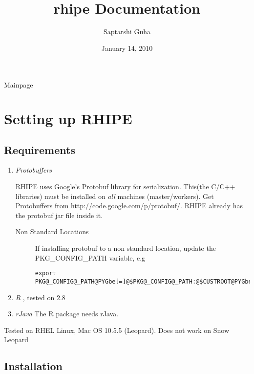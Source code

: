 \documentclass[letterpaper,10pt,english]{manual}
\title{rhipe Documentation}
\date{January 14, 2010}
\author{Saptarshi Guha}
\begin{document}
\maketitle
\tableofcontents



Mainpage

\resetcurrentobjects
\hypertarget{--doc-installation}{}

\chapter{Setting up RHIPE}


\section{Requirements}
\begin{enumerate}
\item {} 
\emph{Protobuffers}

RHIPE uses Google's Protobuf library for serialization. This(the C/C++
libraries) must be installed on \emph{all} machines (master/workers). Get
Protobuffers from \href{http://code.google.com/p/protobuf/}{http://code.google.com/p/protobuf/}. RHIPE already has the
protobuf jar file inside it.
\begin{description}
\item[Non Standard Locations]
If installing protobuf to a non standard location, update the
PKG\_CONFIG\_PATH variable, e.g

\begin{Verbatim}[commandchars=@\[\]]
export PKG@_CONFIG@_PATH@PYGbe[=]@$PKG@_CONFIG@_PATH:@$CUSTROOT@PYGbe[/]lib@PYGbe[/]pkgconfig@PYGbe[/]
\end{Verbatim}

\end{description}

\item {} 
\emph{R} , tested on 2.8

\item {} 
\emph{rJava} The R package needs rJava.

\end{enumerate}

Tested on RHEL Linux, Mac OS 10.5.5 (Leopard).
Does not work on Snow Leopard


\section{Installation}
\end{document}
